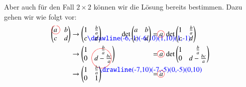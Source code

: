 Aber auch für den Fall $2\times 2$ können wir die Lösung
bereits bestimmen.
Dazu gehen wir wie folgt vor:
\begin{align*}
\begin{pmatrix}
a%
\begin{picture}(0,0)
\color{red}\put(-2,3){\circle{12}}
\end{picture}%
&b\\
c&d%
\end{pmatrix}
&\rightarrow
\begin{pmatrix}1&\frac{b}{a}\\
c%
\begin{picture}(0,0)
\color{blue}\drawline(-6,-1)(-6,10)(1,10)(1,-1)
\end{picture}%
&d\end{pmatrix}
&\det \begin{pmatrix}a&b\\c&d\end{pmatrix}
&=a%
\begin{picture}(0,0)
\color{red}\put(-3,3){\circle{10}}
\end{picture}%
\;
\det
\begin{pmatrix}1&\frac{b}{a}\\c&d\end{pmatrix}
\\
&\rightarrow
\begin{pmatrix}1&\frac{b}{a}\\0&d-\frac{bc}{a}%
\begin{picture}(0,0)
\color{red}\put(-15,3){\circle{28}}
\end{picture}%
\end{pmatrix}
&
&=a%
\begin{picture}(0,0)
\color{red}\put(-3,3){\circle{10}}
\end{picture}%
\;\det\begin{pmatrix}1&\frac{b}{a}\\0&d-\frac{bc}{a}\end{pmatrix}
\\
&\rightarrow
\begin{pmatrix}1&\frac{b}{a}%
\begin{picture}(0,0)
\color{blue}\drawline(-7,10)(-7,-5)(0,-5)(0,10)
\end{picture}%
\\0&1\end{pmatrix}
&
&=a%
\begin{picture}(0,0)
\color{red}\put(-3,3){\circle{10}}
\end{picture}%
\;

\end{align*}
